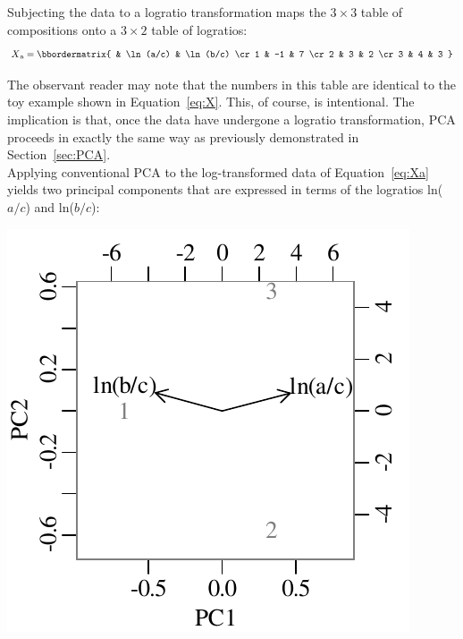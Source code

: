 Subjecting the data to a logratio transformation maps the
${3}\times{3}$ table of compositions onto a ${3}\times{2}$ table of
logratios:
\begin{equation}
  X\textsubscript{a} =
  \bbordermatrix{ & \ln(a/c) & \ln(b/c) \cr
    1 & -1 & 7 \cr
    2 & 3 & 2 \cr
    3 & 4 & 3
  }
  \label{eq:Xa}
\end{equation}

The observant reader may note that the numbers in this table are
identical to the toy example shown in Equation~\ref{eq:X}. This, of
course, is intentional. The implication is that, once the data have
undergone a logratio transformation, PCA proceeds in exactly the same
way as previously demonstrated in Section~\ref{sec:PCA}.\\

Applying conventional PCA to the log-transformed data of
Equation~\ref{eq:Xa} yields two principal components that are
expressed in terms of the logratios ln($a/c$) and ln($b/c$):

\noindent\begin{minipage}[t][][b]{.3\textwidth}
\includegraphics[width=\textwidth]{../figures/alrPCA.pdf}\\
\end{minipage}
\begin{minipage}[t][][t]{.7\textwidth}
  \label{fig:alrPCA}
\end{minipage}

